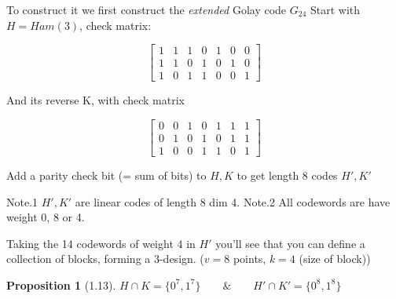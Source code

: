 \documentclass[amsfonts]{amsart}
\newtheorem{prop}[thm]{Proposition}
\theoremstyle{definition}
\theoremstyle{remark}
\numberwithin{equation}{section}
\begin{document}
To construct it we first construct the \emph{extended} Golay code $G_24$
Start with $H = Ham(3)$, check matrix:

\[
	\begin{bmatrix}
	1 & 1 & 1 & 0 & 1 & 0 & 0  \\
	1 & 1 & 0 & 1 & 0 & 1 & 0  \\
	1 & 0 & 1 & 1 & 0 & 0 & 1
	\end{bmatrix}
\]

And its reverse K, with check matrix

\[
	\begin{bmatrix}
	0 & 0 & 1 & 0 & 1 & 1 & 1\\
	0 & 1 & 0 & 1 & 0 & 1 & 1\\
	1 & 0 & 0 & 1 & 1 & 0 & 1
	\end{bmatrix}
\]

Add a parity check bit (= sum of bits) to $H, K$ to get length 8 codes $H', K'$


Note.1 $H', K'$ are linear codes of length 8 dim 4.
Note.2 All codewords are have weight 0, 8 or 4.

Taking the 14 codewords of weight 4 in $H'$ you'll see that you can define a collection of blocks, forming a 3-design. ($v=8$ points, $k=4$ (size of block))

\begin{prop}[1.13]
$H \cap K = \{0^7, 1^7\} \qquad \&  \qquad H'\cap K' = \{0^8, 1^8 \}$
\end{prop}
\end{document}
